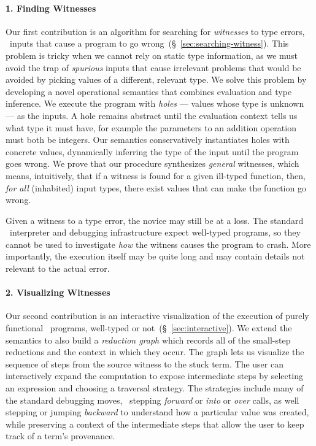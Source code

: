 \paragraph{1. Finding Witnesses}
Our first contribution is an algorithm for searching for
\emph{witnesses} to type errors, \ie\ inputs that cause a
program to go wrong~(\S~\ref{sec:searching-witness}).
%
This problem is tricky when we cannot rely on
static type information, as we must avoid the
trap of \emph{spurious} inputs that cause
irrelevant problems that would be avoided
by picking values of a different, relevant type.
%
We solve this problem by developing a novel
operational semantics that combines evaluation
and type inference.
%
We execute the program with \emph{holes} --- values whose type is
unknown --- as the inputs.
%
A hole remains abstract until the evaluation
context tells us what type it must have, for
example the parameters to an addition operation
must both be integers.
%
Our semantics conservatively instantiates holes
with concrete values, dynamically inferring the
type of the input until the program goes wrong.
%
We prove that our procedure synthesizes \emph{general}
witnesses, which means, intuitively, that if a witness
is found for a given ill-typed function, then, \emph{for all}
(inhabited) input types, there exist values that can make
the function go wrong.

Given a witness to a type error, the novice may still be at a loss.
%
The standard \ocaml\ interpreter and debugging infrastructure expect
well-typed programs, so they cannot be used to investigate \emph{how}
the witness causes the program to crash.
%
More importantly, the execution itself may be quite long and may contain
details not relevant to the actual error.

\paragraph{2. Visualizing Witnesses}
Our second contribution is an interactive visualization of the
execution of purely functional \ocaml\ programs, well-typed or not~(\S~\ref{sec:interactive}).
%
We extend the semantics to also build a \emph{reduction graph}
which records all of the small-step reductions and the context
in which they occur.
%
The graph lets us visualize the sequence of
steps from the source witness to the stuck term. The user can
interactively expand the computation to expose intermediate steps
by selecting an expression and choosing a traversal strategy.
%
The strategies include many of the standard debugging moves, \eg\
stepping \emph{forward} or \emph{into} or \emph{over} calls, as well
stepping or jumping \emph{backward} to understand how a particular
value was created, while preserving a context of the intermediate
steps that allow the user to keep track of a term's provenance.

